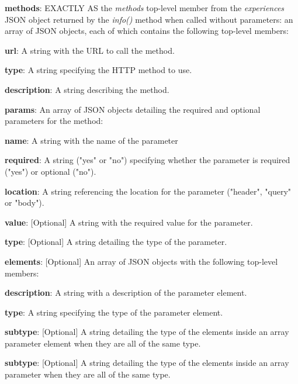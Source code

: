 \begin{myEnumerate}
\begin{myEnumerate}
\begin{myEnumerate}
        \end{myEnumerate}
        \item \textbf{methods}: EXACTLY AS the \textit{methods} top-level member from the \textit{experiences} JSON object returned by the \textit{info()} method when called without parameters: an array of JSON objects, each of which contains the following top-level members:
        \begin{myEnumerate}
            \item \textbf{url}: A string with the URL to call the method.
            \item \textbf{type}: A string specifying the HTTP method to use.
            \item \textbf{description}: A string describing the method.
           \item \textbf{params}: An array of JSON objects detailing the required and optional parameters for the method:
            \begin{myEnumerate}
                \item \textbf{name}: A string with the name of the parameter
                \item \textbf{required}: A string ("yes" or "no") specifying whether the parameter is required ("yes") or optional ("no").
                \item \textbf{location}: A string referencing the location for the parameter ("header", "query" or "body").
                \item \textbf{value}: [Optional] A string with the required value for the parameter.
                \item \textbf{type}: [Optional] A string detailing the type of the parameter.
                \item \textbf{elements}: [Optional] An array of JSON objects with the following top-level members:
                \begin{myEnumerate}
                    \item \textbf{description}: A string with a description of the parameter element.
                    \item \textbf{type}: A string specifying the type of the parameter element.
                    \item \textbf{subtype}: [Optional] A string detailing the type of the elements inside an array parameter element when they are all of the same type.
                \end{myEnumerate}
                \item \textbf{subtype}: [Optional] A string detailing the type of the elements inside an array parameter when they are all of the same type.

\end{myEnumerate}
\end{myEnumerate}
\end{myEnumerate}
\end{myEnumerate}
